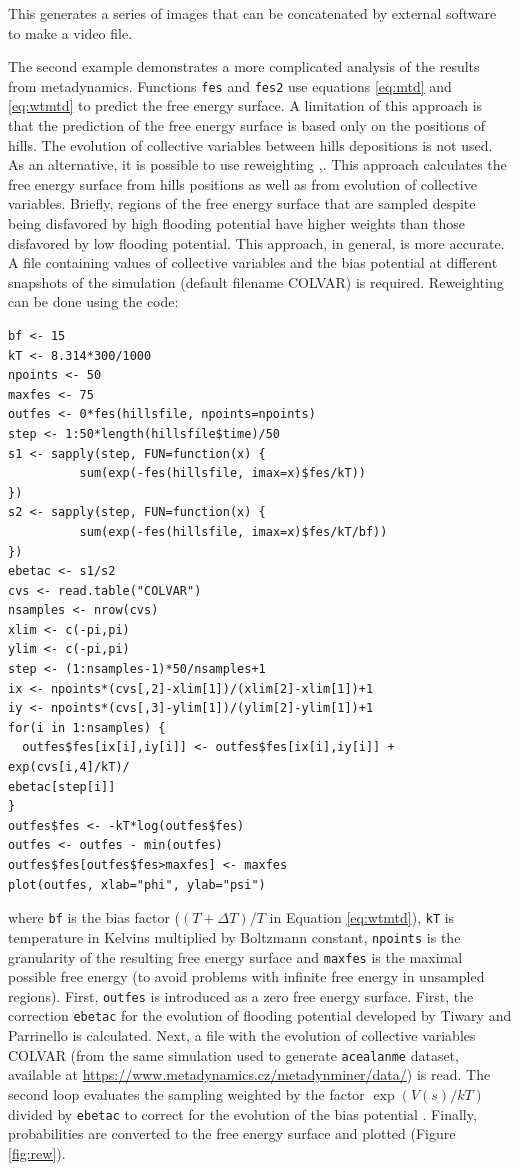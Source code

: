 This generates a series of images that can be concatenated by external
software to make a video file.

The second example demonstrates a more complicated analysis of the
results from metadynamics. Functions \texttt{fes} and \texttt{fes2} use
equations \eqref{eq:mtd} and \eqref{eq:wtmtd} to predict the free energy
surface. A limitation of this approach is that the prediction of the
free energy surface is based only on the positions of hills. The
evolution of collective variables between hills depositions is not used.
As an alternative, it is possible to use reweighting
\citep{us},\citep{tiwary}. This approach calculates the free energy
surface from hills positions as well as from evolution of collective
variables. Briefly, regions of the free energy surface that are sampled
despite being disfavored by high flooding potential have higher weights
than those disfavored by low flooding potential. This approach, in
general, is more accurate. A file containing values of collective
variables and the bias potential at different snapshots of the
simulation (default filename COLVAR) is required. Reweighting can be
done using the code:

\begin{verbatim}
bf <- 15
kT <- 8.314*300/1000
npoints <- 50
maxfes <- 75
outfes <- 0*fes(hillsfile, npoints=npoints)
step <- 1:50*length(hillsfile$time)/50
s1 <- sapply(step, FUN=function(x) {
          sum(exp(-fes(hillsfile, imax=x)$fes/kT))
})
s2 <- sapply(step, FUN=function(x) {
          sum(exp(-fes(hillsfile, imax=x)$fes/kT/bf))
})
ebetac <- s1/s2
cvs <- read.table("COLVAR")
nsamples <- nrow(cvs)
xlim <- c(-pi,pi)
ylim <- c(-pi,pi)
step <- (1:nsamples-1)*50/nsamples+1
ix <- npoints*(cvs[,2]-xlim[1])/(xlim[2]-xlim[1])+1
iy <- npoints*(cvs[,3]-ylim[1])/(ylim[2]-ylim[1])+1
for(i in 1:nsamples) {
  outfes$fes[ix[i],iy[i]] <- outfes$fes[ix[i],iy[i]] + exp(cvs[i,4]/kT)/
ebetac[step[i]]
}
outfes$fes <- -kT*log(outfes$fes)
outfes <- outfes - min(outfes)
outfes$fes[outfes$fes>maxfes] <- maxfes
plot(outfes, xlab="phi", ylab="psi")
\end{verbatim}

where \texttt{bf} is the bias factor (\((T+\Delta T)/T\) in Equation
\eqref{eq:wtmtd}), \texttt{kT} is temperature in Kelvins multiplied by
Boltzmann constant, \texttt{npoints} is the granularity of the resulting
free energy surface and \texttt{maxfes} is the maximal possible free
energy (to avoid problems with infinite free energy in unsampled
regions). First, \texttt{outfes} is introduced as a zero free energy
surface. First, the correction \texttt{ebetac} for the evolution of
flooding potential developed by Tiwary and Parrinello \citep{tiwary} is
calculated. Next, a file with the evolution of collective variables
COLVAR (from the same simulation used to generate \texttt{acealanme}
dataset, available at
\url{https://www.metadynamics.cz/metadynminer/data/}) is read. The
second loop evaluates the sampling weighted by the factor
\(\exp (V(s)/kT)\) divided by \texttt{ebetac} to correct for the
evolution of the bias potential \citep{tiwary}. Finally, probabilities
are converted to the free energy surface and plotted (Figure
\ref{fig:rew}).

